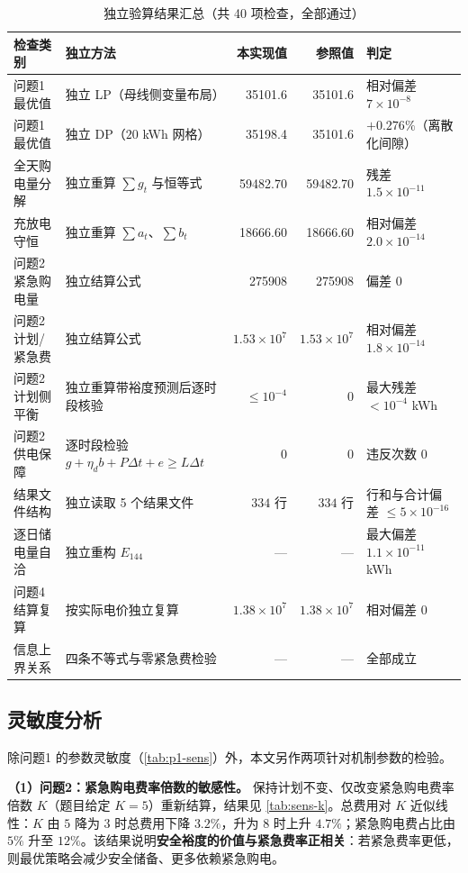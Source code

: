\begin{table}[H]
  \centering
  \caption{独立验算结果汇总（共 40 项检查，全部通过）}
  \label{tab:verify}
  \small
  \begin{tabular}{p{3.4cm}p{4.6cm}rrl}
    \toprule[1.5pt]
    检查类别 & 独立方法 & 本实现值 & 参照值 & 判定 \\
    \midrule[1pt]
    问题1 最优值 & 独立 LP（母线侧变量布局） & 35101.6 & 35101.6 & 相对偏差 $7\times10^{-8}$ \\
    问题1 最优值 & 独立 DP（$20$ \si{kWh} 网格） & 35198.4 & 35101.6 & $+0.276\%$（离散化间隙） \\
    全天购电量分解 & 独立重算 $\sum g_t$ 与恒等式 & 59482.70 & 59482.70 & 残差 $1.5\times10^{-11}$ \\
    充放电守恒 & 独立重算 $\sum a_t$、$\sum b_t$ & 18666.60 & 18666.60 & 相对偏差 $2.0\times10^{-14}$ \\
    问题2 紧急购电量 & 独立结算公式 & 275908 & 275908 & 偏差 $0$ \\
    问题2 计划/紧急费 & 独立结算公式 & $1.53\times10^7$ & $1.53\times10^7$ & 相对偏差 $1.8\times10^{-14}$ \\
    问题2 计划侧平衡 & 独立重算带裕度预测后逐时段核验 & $\le10^{-4}$ & $0$ & 最大残差 $<10^{-4}$ \si{kWh} \\
    问题2 供电保障 & 逐时段检验 $g+\eta_db+P\Delta t+e\ge L\Delta t$ & $0$ & $0$ & 违反次数 $0$ \\
    结果文件结构 & 独立读取 5 个结果文件 & $334$ 行 & $334$ 行 & 行和与合计偏差 $\le5\times10^{-16}$ \\
    逐日储电量自洽 & 独立重构 $E_{144}$ & --- & --- & 最大偏差 $1.1\times10^{-11}$ \si{kWh} \\
    问题4 结算复算 & 按实际电价独立复算 & $1.38\times10^7$ & $1.38\times10^7$ & 相对偏差 $0$ \\
    信息上界关系 & 四条不等式与零紧急费检验 & --- & --- & 全部成立 \\
    \bottomrule[1.5pt]
  \end{tabular}
\end{table}

\subsection{灵敏度分析}

除问题1 的参数灵敏度（\cref{tab:p1-sens}）外，本文另作两项针对机制参数的检验。

\textbf{（1）问题2：紧急购电费率倍数的敏感性。} 保持计划不变、仅改变紧急购电费率倍数 $K$（题目给定 $K=5$）重新结算，结果见 \cref{tab:sens-k}。总费用对 $K$ 近似线性：$K$ 由 $5$ 降为 $3$ 时总费用下降 $3.2\%$，升为 $8$ 时上升 $4.7\%$；紧急购电费占比由 $5\%$ 升至 $12\%$。该结果说明\textbf{安全裕度的价值与紧急费率正相关}：若紧急费率更低，则最优策略会减少安全储备、更多依赖紧急购电。

